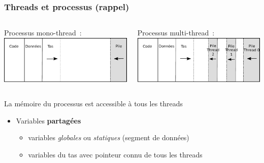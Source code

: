 \documentclass{beamer}
\begin{document}
\begin{frame}
    \frametitle{Threads et processus (rappel)}

    \begin{columns}[t]
      \begin{center}
        Processus mono-thread~:
        \includegraphics[height=0.2\textheight]{memoire_processus}
      \end{center}
      
      \begin{center}
        Processus multi-thread~:
        \includegraphics[height=0.2\textheight]{memoire_processus_multi-thread}
      \end{center}
    \end{columns}

\bigskip 

\begin{block}{La mémoire du processus est accessible à tous les threads}
\begin{itemize}

\item Variables \textbf{\alert{partagées}}
  \begin{itemize}
  \item variables \emph{globales} ou \emph{statiques} (segment de données)
  \item variables du tas avec pointeur connu de tous les threads
  \end{itemize}
  

\end{itemize}
\end{block}
\end{frame}
\end{document}
